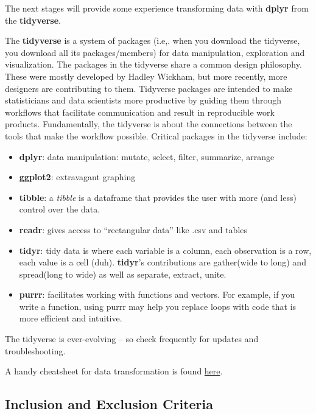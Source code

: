 \documentclass[
  english,
]{book}
\providecommand{\tightlist}{%
  \setlength{\itemsep}{0pt}\setlength{\parskip}{0pt}}
\begin{document}
The next stages will provide some experience transforming data with \textbf{dplyr} from the \textbf{tidyverse}.

The \textbf{tidyverse} is a system of packages (i.e,. when you download the tidyverse, you download all its packages/members) for data manipulation, exploration and visualization. The packages in the tidyverse share a common design philosophy. These were mostly developed by Hadley Wickham, but more recently, more designers are contributing to them. Tidyverse packages are intended to make statisticians and data scientists more productive by guiding them through workflows that facilitate communication and result in reproducible work products. Fundamentally, the tidyverse is about the connections between the tools that make the workflow possible. Critical packages in the tidyverse include:

\begin{itemize}
\tightlist
\item
  \textbf{dplyr}: data manipulation: mutate, select, filter, summarize, arrange
\item
  \textbf{ggplot2}: extravagant graphing
\item
  \textbf{tibble}: a \emph{tibble} is a dataframe that provides the user with more (and less) control over the data.
\item
  \textbf{readr}: gives access to ``rectangular data'' like .csv and tables
\item
  \textbf{tidyr}: tidy data is where each variable is a column, each observation is a row, each value is a cell (duh). \textbf{tidyr}'s contributions are gather(wide to long) and spread(long to wide) as well as separate, extract, unite.
\item
  \textbf{purrr}: facilitates working with functions and vectors. For example, if you write a function, using purrr may help you replace loops with code that is more efficient and intuitive.
\end{itemize}

The tidyverse is ever-evolving -- so check frequently for updates and troubleshooting.

A handy cheatsheet for data transformation is found \href{https://www.rstudio.com/wp-content/uploads/2015/02/data-wrangling-cheatsheet.pdf}{here}.

\hypertarget{inclusion-and-exclusion-criteria}{%
\subsection{Inclusion and Exclusion Criteria}\label{inclusion-and-exclusion-criteria}}
\end{document}
